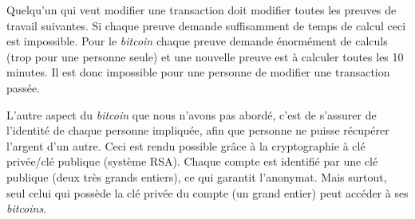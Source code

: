 \documentclass[11pt,class=report,crop=false]{standalone}
\begin{document}
\begin{activite}
Quelqu'un qui veut modifier une transaction doit modifier toutes les preuves de travail suivantes. Si chaque preuve demande suffisamment de temps de calcul ceci est impossible. Pour le \emph{bitcoin} chaque preuve demande énormément de calculs (trop pour une personne seule) et une nouvelle preuve est à calculer toutes les 10 minutes. Il est donc impossible pour une personne de modifier une transaction passée.

\end{activite}


L'autre aspect du \emph{bitcoin} que nous n'avons pas abordé, c'est de s'assurer de l'identité de chaque personne impliquée, afin que personne ne puisse récupérer l'argent d'un autre. Ceci est rendu possible grâce à la cryptographie à clé privée/clé publique (système RSA). Chaque compte est identifié par une clé publique (deux très grands entiers), ce qui garantit l'anonymat. Mais surtout, seul celui qui possède la clé privée du compte (un grand entier) peut accéder à ses \emph{bitcoins}.
\end{document}
